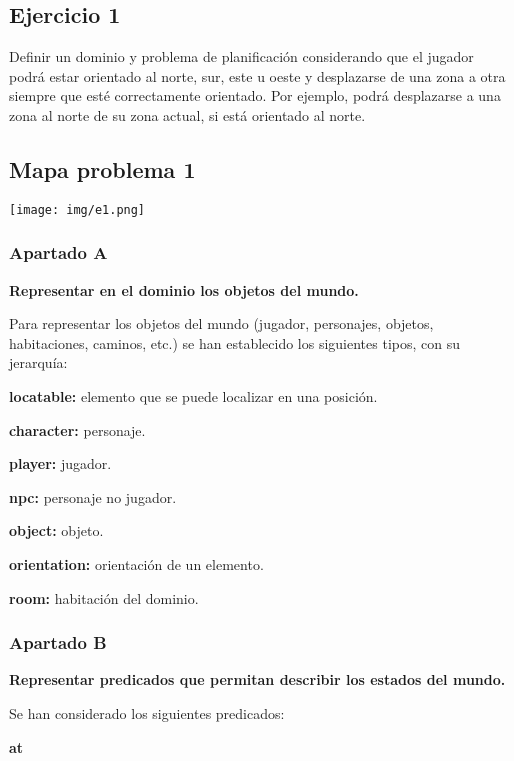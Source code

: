 \documentclass[11pt,a4paper]{article}
\begin{document}
\subsection{Ejercicio 1}

Definir  un  dominio y  problema de  planificación considerando  que  el  jugador podrá    estar  orientado  al  norte,  sur,  este  u  oeste  y  desplazarse  de  una  zona  a  otra siempre  que  esté  correctamente  orientado.  Por  ejemplo,  podrá  desplazarse  a  una zona  al  norte  de  su  zona  actual,  si  está  orientado  al  norte.

\subsection{Mapa problema 1}
\texttt{[image: img/e1.png]}
\subsubsection{Apartado A}

\textbf{Representar en el dominio los objetos del mundo.}

\bigskip

Para representar los objetos del mundo (jugador, personajes, objetos, habitaciones, caminos, etc.) se han establecido
los siguientes tipos, con su jerarquía:

\medskip

\textbf{locatable:} elemento que se puede localizar en una posición.
	
\quad \textbf{character:} personaje.

\quad \quad	\textbf{player:} jugador.

\quad \quad \textbf{npc:} personaje no jugador.

\quad \textbf{object:} objeto.

\textbf{orientation:} orientación de un elemento.

\textbf{room:} habitación del dominio.

\subsubsection{Apartado B}

\textbf{Representar predicados que permitan describir los estados del mundo.}

\bigskip

Se han considerado los siguientes predicados:

\medskip

\large{\textbf{at}}
\end{document}
